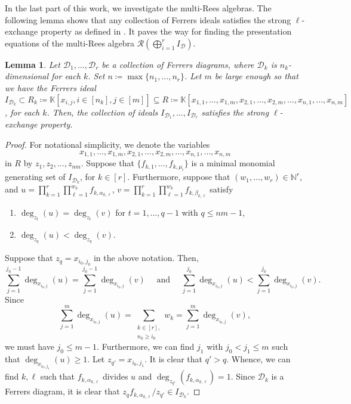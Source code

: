 \documentclass[11pt,a4paper,reqno,dvipsnames]{amsart}
\theoremstyle{plain}
\newtheorem{Lemma}[Theorem]{Lemma}
\theoremstyle{definition}
\newtheorem{Assumptions and Discussion}[Theorem]{Assumptions and Discussion}
\theoremstyle{remark}
\def\deg{\operatorname{deg}}
\def\KK{{\mathbb K}}
\def\NN{{\mathbb N}}
\newcommand\calD{\mathcal{D}}
\newcommand\calR{\mathcal{R}}
\begin{document}
In the last part of this work, we investigate the multi-Rees algebras. The following lemma shows that
any collection of Ferrers ideals 
satisfies the strong $\ell$-exchange property as defined in . It paves the way for finding the presentation equations of the multi-Rees algebra $\calR(\bigoplus_{i=1}^{r} I_{\calD})$.

\begin{Lemma}
    \label{LEx}
    Let $\calD_1,\dots,\calD_r$ be a collection of Ferrers diagrams, where $\calD_k$ is $n_k$-dimensional for each $k$. Set $n\coloneqq \max\{n_1,\dots,n_r\}$. Let $m$ be large enough so that we have the Ferrers ideal $I_{\calD_k} \subset R_k\coloneqq \KK[x_{i,j},i\in [n_k],j\in [m]] \subseteq  R \coloneqq \KK[x_{1,1},\dots,x_{1,m},x_{2,1},\dots,x_{2,m},\dots,x_{n,1},\dots,x_{n,m}]$, for each $k$. Then, the collection of ideals $I_{\calD_1},\dots,I_{\calD_r}$ satisfies the strong $\ell$-exchange property.
\end{Lemma}
\begin{proof}
    For notational simplicity, we denote the variables 
    \[
        x_{1,1},\dots,x_{1,m},x_{2,1},\dots,x_{2,m},\dots,x_{n,1},\dots,x_{n,m} 
    \]
    in $R$ by $z_1, z_2, \dots,z_{nm}$.  Suppose that $\{f_{k,1},\dots,f_{k,\mu_i}\}$ is a minimal monomial generating set of $I_{\calD_k}$, for $k\in [r]$. Furthermore, suppose that $(w_1,\dots,w_r)\in \NN^r$, and $u=\prod_{k=1}^r\prod_{\ell=1}^{w_k} f_{k,\alpha_{k,\ell}}$, $v=\prod_{k=1}^r \prod_{\ell=1}^{w_k} f_{k,\beta_{k,\ell}}$ satisfy
    \begin{enumerate}[i]
        \item $\deg_{z_t}(u)=\deg_{z_t}(v)$ for $t=1,\dots,q-1$ with $q\le nm-1$,
        \item $\deg_{z_q}(u)<\deg_{z_q}(v)$.
    \end{enumerate}
    Suppose that $z_q=x_{i_0,j_0}$ in the above notation. 
    Then,
    \[
        \sum_{j=1}^{j_0-1} \deg_{x_{i_0,j}}(u) =\sum_{j=1}^{j_0-1} \deg_{x_{i_0,j}}(v)    
        \quad\text{ and }\quad
        \sum_{j=1}^{j_0} \deg_{x_{i_0,j}}(u) < \sum_{j=1}^{j_0} \deg_{x_{i_0,j}}(v).    
    \]
    Since
    \[
        \sum_{j=1}^m \deg_{x_{i_0,j}}(u)
        = \sum_{\substack{k\in [r],\\ n_k\ge i_0}} w_k
        =\sum_{j=1}^m \deg_{x_{i_0,j}}(v),
    \]
    we must have $j_0\le m-1$.
    Furthermore, we can find $j_1$ with $j_0<j_1\le m$ such that $\deg_{x_{i_0,j_1}}(u)\ge 1$. Let $z_{q'}=x_{i_0,j_1}$. It is clear that $q'>q$.
Whence, we can find $k,\ell$ such that $f_{k,\alpha_{k,\ell}}$ divides $u$ and $\deg_{z_{q'}}(f_{k,\alpha_{k,\ell}})= 1$. Since ${\calD_{k}}$ is a Ferrers diagram, it is clear that $z_q f_{k,\alpha_{k,\ell}}/z_{q'}\in I_{\calD_{k}}$.
\end{proof}
\end{document}
